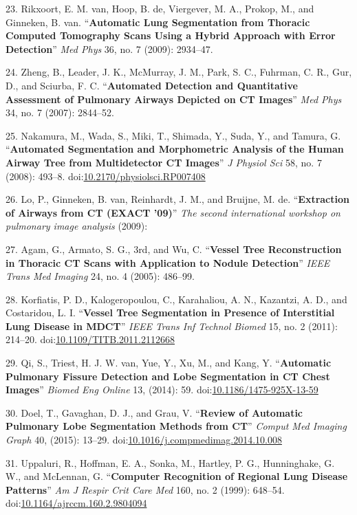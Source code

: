 \documentclass[11pt,]{article}
\begin{document}
23. Rikxoort, E. M. van, Hoop, B. de, Viergever, M. A., Prokop, M., and
Ginneken, B. van. ``\textbf{Automatic Lung Segmentation from Thoracic
Computed Tomography Scans Using a Hybrid Approach with Error
Detection}'' \emph{Med Phys} 36, no. 7 (2009): 2934--47.

24. Zheng, B., Leader, J. K., McMurray, J. M., Park, S. C., Fuhrman, C.
R., Gur, D., and Sciurba, F. C. ``\textbf{Automated Detection and
Quantitative Assessment of Pulmonary Airways Depicted on CT Images}''
\emph{Med Phys} 34, no. 7 (2007): 2844--52.

25. Nakamura, M., Wada, S., Miki, T., Shimada, Y., Suda, Y., and Tamura,
G. ``\textbf{Automated Segmentation and Morphometric Analysis of the
Human Airway Tree from Multidetector CT Images}'' \emph{J Physiol Sci}
58, no. 7 (2008): 493--8.
doi:\href{http://dx.doi.org/10.2170/physiolsci.RP007408}{10.2170/physiolsci.RP007408}

26. Lo, P., Ginneken, B. van, Reinhardt, J. M., and Bruijne, M. de.
``\textbf{Extraction of Airways from CT (EXACT '09)}'' \emph{The second
international workshop on pulmonary image analysis} (2009):

27. Agam, G., Armato, S. G., 3rd, and Wu, C. ``\textbf{Vessel Tree
Reconstruction in Thoracic CT Scans with Application to Nodule
Detection}'' \emph{IEEE Trans Med Imaging} 24, no. 4 (2005): 486--99.

28. Korfiatis, P. D., Kalogeropoulou, C., Karahaliou, A. N., Kazantzi,
A. D., and Costaridou, L. I. ``\textbf{Vessel Tree Segmentation in
Presence of Interstitial Lung Disease in MDCT}'' \emph{IEEE Trans Inf
Technol Biomed} 15, no. 2 (2011): 214--20.
doi:\href{http://dx.doi.org/10.1109/TITB.2011.2112668}{10.1109/TITB.2011.2112668}

29. Qi, S., Triest, H. J. W. van, Yue, Y., Xu, M., and Kang, Y.
``\textbf{Automatic Pulmonary Fissure Detection and Lobe Segmentation in
CT Chest Images}'' \emph{Biomed Eng Online} 13, (2014): 59.
doi:\href{http://dx.doi.org/10.1186/1475-925X-13-59}{10.1186/1475-925X-13-59}

30. Doel, T., Gavaghan, D. J., and Grau, V. ``\textbf{Review of
Automatic Pulmonary Lobe Segmentation Methods from CT}'' \emph{Comput
Med Imaging Graph} 40, (2015): 13--29.
doi:\href{http://dx.doi.org/10.1016/j.compmedimag.2014.10.008}{10.1016/j.compmedimag.2014.10.008}

31. Uppaluri, R., Hoffman, E. A., Sonka, M., Hartley, P. G.,
Hunninghake, G. W., and McLennan, G. ``\textbf{Computer Recognition of
Regional Lung Disease Patterns}'' \emph{Am J Respir Crit Care Med} 160,
no. 2 (1999): 648--54.
doi:\href{http://dx.doi.org/10.1164/ajrccm.160.2.9804094}{10.1164/ajrccm.160.2.9804094}
\end{document}
